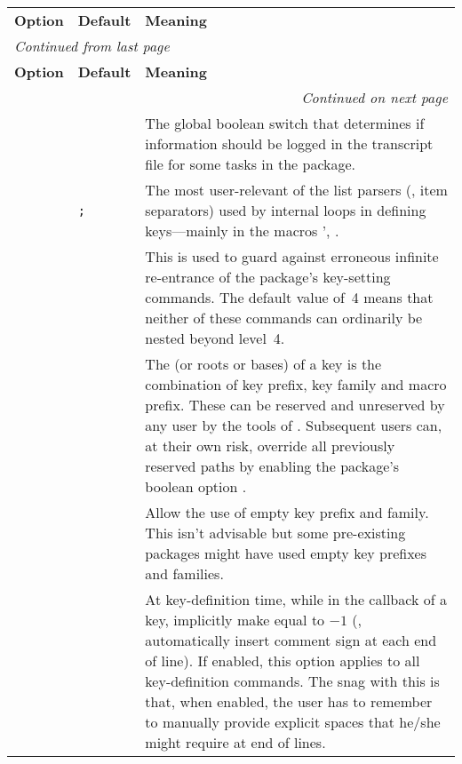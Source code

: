 \documentclass[
  use-a4-paper,
  use-10pt-font,
  final-version,
  use-UK-English,
  fancy-section-headings,
  frame-section-numbers,
  para-abstract-style,
  inputfile,
  input-config-file,
  no-hyperref-messages,
  wrapquote,
]{amltxdoc}
\begin{document}
\begin{syntax}
\begingroup
\small
\begin{tabularx}{\linewidth}{|p{3cm}|p{2cm}|X|}
\caption{Package options. All the package options can also be changed globally via \headhx{\documentclass} and locally through the control sequence \headfx{\setltxkeysoptions}.} \xwmlabel{tab:pkgoptions}
\\\hline
\rowcolor{pink}
\bfseries Option&\bfseries Default&\bfseries Meaning\\\hline
\endfirsthead
\hline
\multicolumn{3}{|l|}{\emph{Continued from last page}}\\\hline
\bfseries Option&\bfseries Default&\bfseries Meaning\\\hline
\endhead
\multicolumn{3}{|r|}{\emph{Continued on next page}}\\\hline
\endfoot
\hline
\endlastfoot
\fx{tracingkeys} & \hx{false} & The global boolean switch that determines if information should be logged in the transcript file for some tasks in the package. \useltablenote[tab:pkgoptions:note1]{ltxkeys-1}\\\hline
\fx{keyparser} & \texttt{;} & The most user-relevant of the list parsers (\ie, item separators) used by internal loops in defining keys---mainly in the macros \ffx'{\ltxkeysdefinekeys, \ltxkeysdeclarekeys}. \useltablenote[tab:pkgoptions:note2]{ltxkeys-2}\\\hline
\fx{keydepthlimit} & \hx{4} & This is used to guard against erroneous infinite re-entrance of the package's key-setting commands. The default value of~4 means that neither of these commands can ordinarily be nested beyond level~4.\useltablenote[tab:pkgoptions:note3]{ltxkeys-3}\\\hline
\fx{reservenopath} & \hx{false} & The \quoted{path} (or roots or bases) of a key is the combination of key prefix, key family and macro prefix. These can be reserved and unreserved by any user by the tools of \sref{sec:reservedpath}. Subsequent users can, at their own risk, override all previously reserved paths by enabling the package's boolean option \fx{reservenopath}.\\\hline
\fx{allowemptypath} & \hx{false} & Allow the use of empty key prefix and family. This isn't advisable but some pre-existing packages might have used empty key prefixes and families. \useltablenote[tab:pkgoptions:note4]{ltxkeys-4}\\\hline
\fx{endcallbackline} & \hx{false} & At key-definition time, while in the callback of a key, implicitly make  \hx{\endlinechar} equal to $-1$ (\ie, automatically insert comment sign at each end of line). If enabled, this option applies to all key-definition commands. The snag with this is that, when enabled, the user has to remember to manually provide explicit spaces that he/she might require at end of lines.
\end{tabularx}
\endgroup



\end{syntax}
\end{document}
